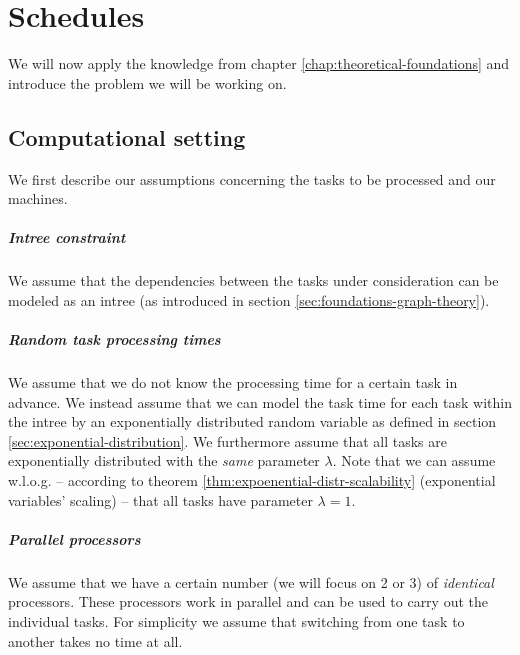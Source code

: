\chapter{Schedules}
\label{chap:introduction-schedules}

We will now apply the knowledge from chapter \ref{chap:theoretical-foundations} and introduce the problem we will be working on. 

\section{Computational setting}
\label{sec:schedules-problem-setting}

We first describe our assumptions concerning the tasks to be processed and our machines.

\paragraph{Intree constraint}

We assume that the dependencies between the tasks under consideration can be modeled as an intree (as introduced in  section \ref{sec:foundations-graph-theory}).

\paragraph{Random task processing times}

We assume that we do not know the processing time for a certain task in advance. We instead assume that we can model the task time for each task within the intree by an exponentially distributed random variable as defined in section \ref{sec:exponential-distribution}. We furthermore assume that all tasks are exponentially distributed with the \emph{same} parameter $\lambda$. Note that we can assume w.l.o.g. --  according to theorem \ref{thm:expoenential-distr-scalability} (exponential variables' scaling) -- that all tasks have parameter $\lambda=1$.

\paragraph{Parallel processors}

We assume that we have a certain number (we will focus on 2 or 3) of \emph{identical} processors. These processors work in parallel and can be used to carry out the individual tasks. For simplicity we assume that switching from one task to another takes no time at all.

